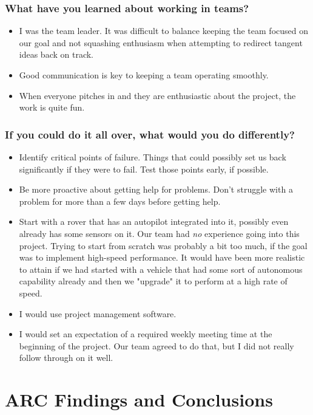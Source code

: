 \documentclass[compsoc,draftclsnofoot,onecolumn,10pt]{IEEEtran}
\begin{document}
\subsubsection*{What have you learned about working in teams?}
\begin{itemize}
    \item I was the team leader. It was difficult to balance keeping the team focused on our goal and not squashing enthusiasm when attempting to redirect tangent ideas back on track.
    \item Good communication is key to keeping a team operating smoothly.
    \item When everyone pitches in and they are enthusiastic about the project, the work is quite fun.
\end{itemize}

\subsubsection*{If you could do it all over, what would you do differently?}
\begin{itemize}
    \item Identify critical points of failure. Things that could possibly set us back significantly if they were to fail.
    \subitem Test those points early, if possible.
    \item Be more proactive about getting help for problems. Don't struggle with a problem for more than a few days before getting help.
    \item Start with a rover that has an autopilot integrated into it, possibly even already has some sensors on it.
    \subitem Our team had \textit{no} experience going into this project. Trying to start from scratch was probably a bit too much, if the goal was to implement high-speed performance. It would have been more realistic to attain if we had started with a vehicle that had some sort of autonomous capability already and then we "upgrade" it to perform at a high rate of speed.
    \item I would use project management software.
    \item I would set an expectation of a required weekly meeting time at the beginning of the project. Our team agreed to do that, but I did not really follow through on it well.
\end{itemize}


\section{ARC Findings and Conclusions}

\end{document}
